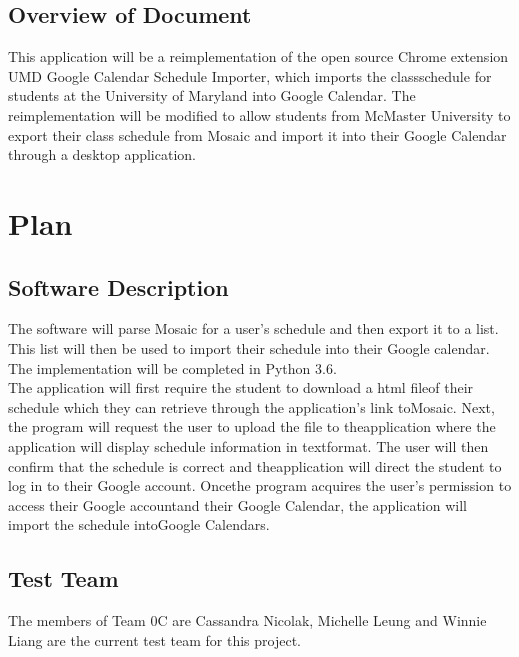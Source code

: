 \documentclass[12pt, titlepage]{article}
\begin{document}

\subsection{Overview of Document}
\color{blue}
\hspace{5mm}This application will be a reimplementation of the open source Chrome extension UMD Google Calendar Schedule Importer, which imports the classschedule for students at the University of Maryland into Google Calendar. The reimplementation will be modified to allow students from McMaster University to export their class schedule from Mosaic and import it into their Google Calendar through a desktop application.
\color{black}

\section{Plan}
	
\subsection{Software Description}
\hspace{5mm}
The software will parse Mosaic for a user's schedule and then export it to a list. This list will then be used to import their schedule into their Google calendar. The implementation will be completed in Python 3.6.\\


\color{blue}
The  application  will  first  require  the  student  to  download  a  html  fileof  their  schedule  which  they  can  retrieve  through  the  application’s  link  toMosaic.   Next,  the  program  will  request  the  user  to  upload  the  file  to  theapplication where the application will display schedule information in textformat.   The  user  will  then  confirm  that  the  schedule  is  correct  and  theapplication will direct the student to log in to their Google account.  Oncethe program acquires the user’s permission to access their Google accountand  their  Google  Calendar,  the  application  will  import  the  schedule  intoGoogle Calendars.
\color{black}

\subsection{Test Team}
\hspace{5mm}
The members of Team 0C are Cassandra Nicolak, Michelle Leung and Winnie Liang are the current test team for this project. \\
\end{document}
